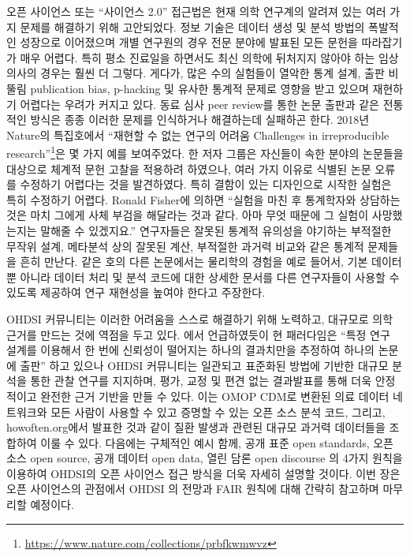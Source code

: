 \documentclass[10.5pt]{book}
\let\rmarkdownfootnote\footnote%
\def\footnote{\protect\rmarkdownfootnote}
\theoremstyle{definition}
\theoremstyle{definition}
\theoremstyle{definition}
\theoremstyle{remark}
\begin{document}
오픈 사이언스 또는 ``사이언스 2.0'' \citep{wiki:Science_2.0} 접근법은
현재 의학 연구계의 알려져 있는 여러 가지 문제를 해결하기 위해
고안되었다. 정보 기술은 데이터 생성 및 분석 방법의 폭발적인 성장으로
이어졌으며 개별 연구원의 경우 전문 분야에 발표된 모든 문헌을 따라잡기가
매우 어렵다. 특히 평소 진료일을 하면서도 최신 의학에 뒤처지지 않아야
하는 임상 의사의 경우는 훨씬 더 그렇다. 게다가, 많은 수의 실험들이
열악한 통계 설계, 출판 비뚤림 publication bias, p-hacking 및 유사한
통계적 문제로 영향을 받고 있으며 재현하기 어렵다는 우려가 커지고 있다.
동료 심사 peer review를 통한 논문 출판과 같은 전통적인 방식은 종종
이러한 문제를 인식하거나 해결하는데 실패하곤 한다. 2018년 Nature의
특집호에서 ``재현할 수 없는 연구의 어려움 Challenges in irreproducible
research''\footnote{\url{https://www.nature.com/collections/prbfkwmwvz}}은
몇 가지 예를 보여주었다. 한 저자 그룹은 자신들이 속한 분야의 논문들을
대상으로 체계적 문헌 고찰을 적용하려 하였으나, 여러 가지 이유로 식별된
논문 오류를 수정하기 어렵다는 것을 발견하였다. 특히 결함이 있는
디자인으로 시작한 실험은 특히 수정하기 어렵다. Ronald Fisher에 의하면
``실험을 마친 후 통계학자와 상담하는 것은 마치 그에게 사체 부검을
해달라는 것과 같다. 아마 무엇 때문에 그 실험이 사망했는지는 말해줄 수
있겠지요.'' \citep{wikiquote:Ronald_Fisher} 연구자들은 잘못된 통계적
유의성을 야기하는 부적절한 무작위 설계, 메타분석 상의 잘못된 계산,
부적절한 과거력 비교와 같은 통계적 문제들을 흔히 만난다.
\citep{allison_2016} 같은 호의 다른 논문에서는 물리학의 경험을 예로
들어서, 기본 데이터 뿐 아니라 데이터 처리 및 분석 코드에 대한 상세한
문서를 다른 연구자들이 사용할 수 있도록 제공하여 연구 재현성을 높여야
한다고 주장한다. \citep{Chen2018}

OHDSI 커뮤니티는 이러한 어려움을 스스로 해결하기 위해 노력하고, 대규모로
의학 근거를 만드는 것에 역점을 두고 있다. \citet{schuemie_2018b} 에서
언급하였듯이 현 패러다임은 ``특정 연구 설계를 이용해서 한 번에 신뢰성이
떨어지는 하나의 결과치만을 추정하여 하나의 논문에 출판'' 하고 있으나
OHDSI 커뮤니티는 일관되고 표준화된 방법에 기반한 대규모 분석을 통한 관찰
연구를 지지하며, 평가, 교정 및 편견 없는 결과발표를 통해 더욱 안정적이고
완전한 근거 기반을 만들 수 있다. 이는 OMOP CDM로 변환된 의료 데이터
네트워크와 모든 사람이 사용할 수 있고 증명할 수 있는 오픈 소스 분석
코드, 그리고, howoften.org에서 발표한 것과 같이 질환 발생과 관련된
대규모 과거력 데이터들을 조합하여 이룰 수 있다. 다음에는 구체적인 예시
함께, 공개 표준 open standards, 오픈 소스 open source, 공개 데이터 open
data, 열린 담론 open discourse 의 4가지 원칙을 이용하여 OHDSI의 오픈
사이언스 접근 방식을 더욱 자세히 설명할 것이다. 이번 장은 오픈
사이언스의 관점에서 OHDSI 의 전망과 FAIR 원칙에 대해 간략히 참고하며
마무리할 예정이다.
\end{document}
